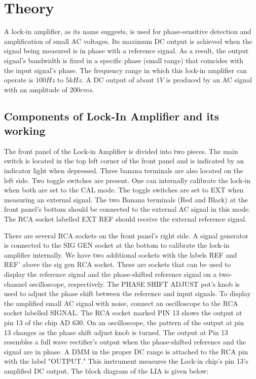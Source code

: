 \section{Theory}
	A lock-in amplifier, as its name suggests, is used for phase-sensitive detection and amplification of small AC voltages. Its maximum DC output is achieved when the signal being measured is in phase with a reference signal. As a result, the output signal's bandwidth is fixed in a specific phase (small range) that coincides with the input signal's phase. The frequency range in which this lock-in amplifier can operate is $100 Hz$ to $5 kHz$. A DC output of about $1V$ is produced by an AC signal with an amplitude of $200 rms$.

	\subsection{Components of Lock-In Amplifier and its working}
		The front panel of the Lock-in Amplifier is divided into two pieces. The main switch is located in the top left corner of the front panel and is indicated by an indicator light when depressed. Three banana terminals are also located on the left side. Two toggle switches are present. One can internally calibrate the lock-in when both are set to the CAL mode. The toggle switches are set to EXT when measuring an external signal. The two Banana terminals (Red and Black) at the front panel's bottom should be connected to the external AC signal in this mode. The RCA socket labelled EXT REF should receive the external reference signal.

		There are several RCA sockets on the front panel's right side. A signal generator is connected to the SIG GEN socket at the bottom to calibrate the lock-in amplifier internally. We have two additional sockets with the labels REF and REF' above the sig gen RCA socket. These are sockets that can be used to display the reference signal and the phase-shifted reference signal on a two-channel oscilloscope, respectively. The PHASE SHIFT ADJUST pot's knob is used to adjust the phase shift between the reference and input signals. To display the amplified small AC signal with noise, connect an oscilloscope to the RCA socket labelled SIGNAL. The RCA socket marked PIN 13 shows the output at pin 13 of the chip AD 630. On an oscilloscope, the pattern of the output at pin 13 changes as the phase shift adjust knob is turned. The output at Pin 13 resembles a full wave rectifier's output when the phase-shifted reference and the signal are in phase. A DMM in the proper DC range is attached to the RCA pin with the label "OUTPUT." This instrument measures the Lock-in chip's pin 13's amplified DC output. The block diagram of the LIA is given below:

